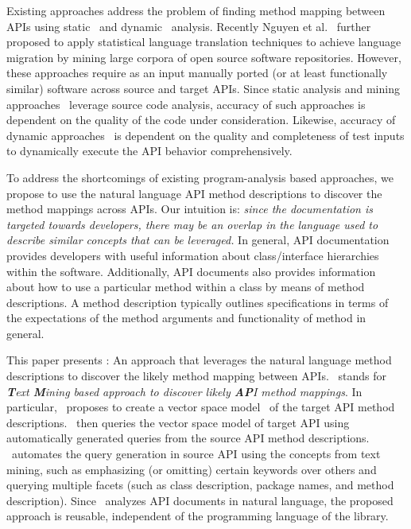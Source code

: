 Existing approaches
address the problem of finding method mapping between APIs using
static~\cite{Zhong2010ICSE} and dynamic~\cite{Gokhale2013ICSE} analysis. 
Recently Nguyen et al.~\cite{nguyen2014statistical} further proposed to
apply statistical language translation techniques to achieve language migration
by mining large corpora of open source software repositories.
However, these approaches require as an input manually ported
(or at least functionally similar) software across source and target APIs.
Since static analysis and mining approaches~\cite{Zhong2010ICSE,nguyen2014statistical}
leverage source code analysis, 
accuracy of such approaches is dependent on the quality of the code under consideration.
Likewise, accuracy of dynamic approaches~\cite{Gokhale2013ICSE} is dependent on
the quality and completeness of test inputs
to dynamically execute the API behavior comprehensively. 


To address the shortcomings of existing program-analysis based approaches,
we propose to use the natural language API method descriptions
to discover the method mappings across APIs.
Our intuition is:
\textit{since the documentation is targeted towards developers,
	there may be an overlap in the language used to describe similar concepts that can be leveraged.}
In general, API documentation provides developers with useful information
about class/interface hierarchies within the software.
Additionally, API documents also provides information about
how to use a particular method within a class by means of method descriptions.
A method description typically outlines specifications in terms of
the expectations of the method arguments and functionality of method in general.


This paper presents \tool : An approach that leverages the natural language method descriptions to discover the likely method mapping between APIs.
\tool\ stands for \textit{\textbf{T}ext \textbf{M}ining
	based approach to discover likely \textbf{AP}I method mappings}.
In particular, \tool\ proposes to create a vector space model~\cite{singhal2001modern,manning2008introduction} of the target API method descriptions. 
\tool\ then queries the vector space model of target API using
automatically generated queries from the source API method descriptions.
\tool\ automates the query generation in source API using the concepts from text mining, such as emphasizing (or omitting) certain keywords over others and querying multiple facets (such as class description, package names, and method description).
Since \tool\ analyzes API documents in natural language, the proposed approach is reusable, independent of the programming language of the library.


